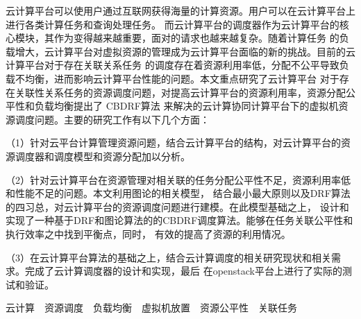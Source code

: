 
\begin{cabstract}
	
	云计算平台可以使用户通过互联网获得海量的计算资源。用户可以在云计算平台上进行各类计算任务和查询处理任务。
	而云计算平台的调度器作为云计算平台的核心模块，其作为变得越来越重要，面对的请求也越来越复杂。随着计算任务
	的负载增大，云计算平台对虚拟资源的管理成为云计算平台面临的新的挑战。目前的云计算平台对于存在关联关系任务
	的调度存在着资源利用率低，分配不公平导致负载不均衡，进而影响云计算平台性能的问题。本文重点研究了云计算平台
	对于存在关联性关系任务的资源调度问题，对提高云计算平台的资源利用率，资源分配公平性和负载均衡提出了 CBDRF算法
	来解决的云计算协同计算平台下的虚拟机资源调度问题。主要的研究工作有以下几个方面：
	
	（1）针对云平台计算管理资源问题，结合云计算平台的结构，对云计算平台的资源调度器和调度模型和资源分配加以分析。

	（2）针对云计算平台在资源管理对相关联的任务分配公平性不足，资源利用率低和性能不足的问题。本文利用图论的相关模型，
结合最小最大原则以及DRF算法的四习总，对云计算平台的资源调度问题进行建模。在此模型基础之上，
设计和实现了一种基于DRF和图论算法的的CBDRF调度算法。能够在任务关联公平性和执行效率之中找到平衡点，同时，
有效的提高了资源的利用情况。

	（3）在云计算平台算法的基础之上，结合云计算调度的相关研究现状和相关需求。完成了云计算调度器的设计和实现，最后
在openstack平台上进行了实际的测试和验证。

\end{cabstract}


\begin{ckeywords}
云计算~~资源调度~~负载均衡~~虚拟机放置~~资源公平性~~关联任务~~
\end{ckeywords}




